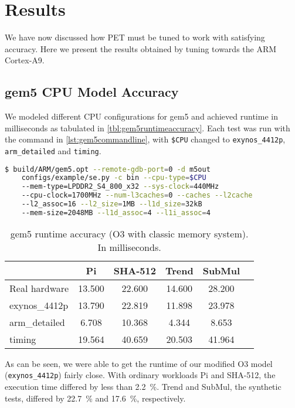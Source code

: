 \section{Results}

We have now discussed how PET must be tuned to work with satisfying accuracy.
Here we present the results obtained by tuning towards the ARM Cortex-A9.

\subsection{gem5 CPU Model Accuracy}

We modeled different CPU configurations for gem5 and achieved runtime in
milliseconds as tabulated in \autoref{tbl:gem5runtimeaccuracy}. Each test was
run with the command in \autoref{lst:gem5commandline}, with \texttt{\$CPU}
changed to \texttt{exynos\_4412p}, \texttt{arm\_detailed} and \texttt{timing}.

\begin{lstlisting}[float=htb,language=sh,numbers=none,label={lst:gem5commandline},caption={gem5
Command Line.}]
$ build/ARM/gem5.opt --remote-gdb-port=0 -d m5out
    configs/example/se.py -c bin --cpu-type=$CPU
    --mem-type=LPDDR2_S4_800_x32 --sys-clock=440MHz
    --cpu-clock=1700MHz --num-l3caches=0 --caches --l2cache
    --l2_assoc=16 --l2_size=1MB --l1d_size=32kB
    --mem-size=2048MB --l1d_assoc=4 --l1i_assoc=4
\end{lstlisting}

\begin{table}[ht]
\centering
\begin{tabular}{|l|c|c|c|c|c|}
\hline
                & Pi      & SHA-512 & Trend   & SubMul \\
\hline
Real hardware   & 13.500  & 22.600  & 14.600  & 28.200 \\
exynos\_4412p   & 13.790  & 22.819  & 11.898  & 23.978 \\
arm\_detailed   &  6.708  & 10.368  &  4.344  &  8.653 \\
timing          & 19.564  & 40.659  & 20.503  & 41.964 \\
\hline
\end{tabular}
\caption{gem5 runtime accuracy (O3 with classic memory system). In milliseconds.}
\label{tbl:gem5runtimeaccuracy}
\end{table}

As can be seen, we were able to get the runtime of our modified O3
model (\texttt{exynos\_4412p}) fairly close. With ordinary workloads Pi and
SHA-512, the execution time differed by less
than 2.2~\%. Trend and SubMul, the synthetic tests, differed by 22.7~\% and
17.6~\%, respectively.


